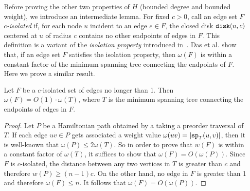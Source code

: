 \documentclass{llncs}
\newcommand{\ABox}{
\raisebox{3pt}{\framebox[6pt]{\rule{6pt}{0pt}}}
}
\newcommand{\ssp}{{\tt sp}}
\newcommand{\disk}{{\tt disk}}
\newcommand{\w}{\omega}
\begin{document}
Before proving the other two properties of $H$ (bounded degree and bounded weight), we
introduce an intermediate lemma. For fixed $c > 0$, call an edge set
$F$ \emph{$c$-isolated} if,
for each node $u$ incident to an edge $e \in F$, the closed disk $\disk(u,c)$ centered at
$u$ of radius $c$ contains no other endpoints of edges in $F$. This definition is a
variant of the \emph{isolation property} introduced in~\cite{Das95}. Das et al. show
that, if an edge set $F$ satisfies the isolation property, then $\w(F)$ is within a
constant factor of the minimum spanning tree connecting the endpoints of $F$. Here we
prove a similar result.

\begin{lemma}
Let $F$ be a $c$-isolated set of edges no longer than 1.
Then $\w(F) = O(1)\cdot\w(T)$, where $T$ is the
minimum spanning tree connecting the endpoints of edges in $F$.
\label{lem:isolated}
\end{lemma}
\begin{proof}
Let $P$ be a Hamiltonian path obtained by a taking a preorder traversal of $T$.
If each edge $uv \in P$ gets associated a weight value $\w(uv) = |\ssp_T(u,v)|$,
then it is well-known that $\w(P) \le 2\w(T)$. So in order to prove that $w(F)$
is within a constant factor of $\w(T)$, it suffices to show that $\w(F) = O(\w(P))$.
Since $F$ is $c$-isolated, the distance between any two vertices in $T$ is greater
than $c$ and therefore $w(P) \ge (n-1)c$.
On the other hand, no edge in $F$ is greater than 1 and therefore
$\w(F) \le n$. It follows that $\w(F) = O(\w(P))$. \hfill\ABox
\end{proof}
\end{document}
